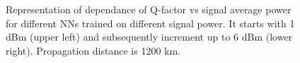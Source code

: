 \begin{figure}[tpb]
    \begin{minipage}[h]{0.48\linewidth}
    \end{minipage}
    \hfill
    \begin{minipage}[h]{0.48\linewidth}
    \end{minipage}
    \caption{Representation of dependance of Q-factor vs signal average power for different NNs trained on different signal power. It starts with 1 dBm (upper left) and subsequently increment up to 6 dBm (lower right). Propagation distance is 1200 km.}
    \label{fig:nn_eq_z_1200}
\end{figure}

